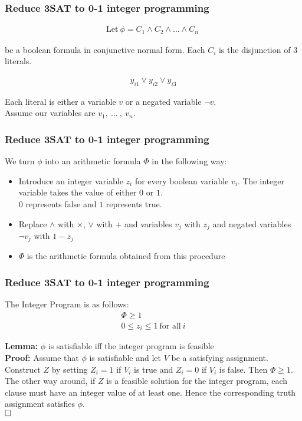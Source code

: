 \documentclass[mathserif]{beamer}
\renewcommand{\qed}{\hfill\square}
\begin{document}
\begin{frame}
\frametitle{Reduce 3SAT to 0-1 integer programming}
\begin{align*}
\text{Let}\ \phi = C_1 \wedge C_2 \wedge \ldots \wedge C_n\
\end{align*}
\begin{center}
be a boolean formula in conjunctive normal form. Each $C_i$ is the disjunction of 3 literals.
\end{center}
\begin{align*}
y_{i1} \vee y_{i2} \vee y_{i3}
\end{align*}

\begin{center}
Each literal is either a variable $v$ or a negated variable $\neg v$.\\

Assume our variables are $v_1,\ \ldots\ ,\ v_n$.
\end{center}

\end{frame}

\begin{frame}
\frametitle{Reduce 3SAT to 0-1 integer programming}
We turn $\phi$ into an arithmetic formula $\Phi$ in the following way:
\begin{itemize}
\item Introduce an integer variable $z_i$ for every boolean variable $v_i$. The
integer variable takes the value of either $0$ or $1$.\\$0$ represents false and
$1$ represents true.
\item Replace $\wedge$ with $\times$, $\vee$ with $+$ and variables $v_j$ with
	$z_j$ and negated variables $\neg v_j$ with $1 - z_j$
\item $\Phi$ is the arithmetic formula obtained from this procedure
\end{itemize}
\end{frame}

\begin{frame}
\frametitle{Reduce 3SAT to 0-1 integer programming}
The Integer Program is as follows:
\begin{align*}
\Phi \geq 1\\
0 \leq z_i \leq 1\ \text{for all}\ i
\end{align*}

\textbf{Lemma:} $\phi$ is satisfiable iff the integer program is feasible\\
\textbf{Proof:} Assume that $\phi$ is satisfiable and let $V$ be a satisfying
assignment. Construct $Z$ by setting $Z_i = 1$ if $V_i$ is true and
$Z_i = 0$ if $V_i$ is false. Then $\Phi \geq 1$.\\
The other way around, if $Z$ is a feasible solution for the integer program,
each clause must have an integer value of at least one. Hence the corresponding
truth assignment satisfies $\phi$.\\
$\qed$
\end{frame}
\end{document}
